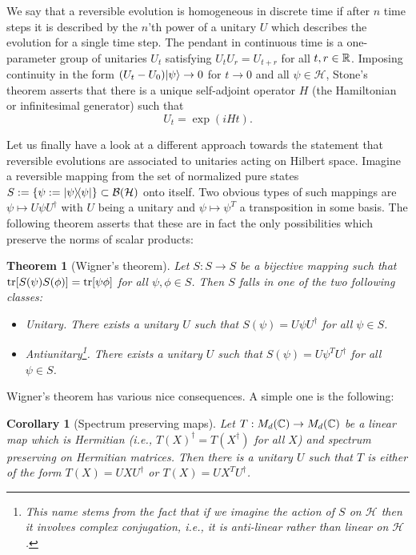 \documentclass[11pt,a4paper]{article}
\theoremstyle{plain}
\newtheorem{theorem}{Theorem}[section]
\newtheorem{corollary}{Corollary}[section]
\theoremstyle{definition}
\theoremstyle{remark}
\numberwithin{equation}{section}
\begin{document}
We say that a reversible evolution is homogeneous in discrete time if after $n$ time steps it is described by the $n$'th power of a unitary $U$ which describes the evolution for a single time step. The pendant in continuous time is a one-parameter group of unitaries $U_t$ satisfying $U_tU_r=U_{t+r}$ for all $t,r\in \mathbb{R}$. Imposing continuity in the form $(U_t-U_0)|\psi\rangle\to 0$ for $t\to 0$ and all $\psi\in \mathcal{H}$, Stone's theorem asserts that there is a unique self-adjoint operator $H$ (the Hamiltonian or infinitesimal generator) such that
\begin{equation}
    U_t = \exp(iHt).
\end{equation}

Let us finally have a look at a different approach towards the statement that reversible evolutions are associated to unitaries acting on Hilbert space. Imagine a reversible mapping from the set of normalized pure states $S:=\{\psi:=|\psi\rangle\!\langle\psi|\}\subset \mathcal{B}(\mathcal{H})$ onto itself. Two obvious types of such mappings are $\psi\mapsto U\psi U^\dagger$ with $U$ being a unitary and $\psi\mapsto \psi^T$ a transposition in some basis. The following theorem asserts that these are in fact the only possibilities which preserve the norms of scalar products:

\begin{theorem}[Wigner's theorem]
    Let $S:S\to S$ be a bijective mapping such that $\operatorname{tr}[S(\psi)S(\phi)]=\operatorname{tr}[\psi\phi]$ for all $\psi,\phi\in S$. Then $S$ falls in one of the two following classes:
    \begin{itemize}
        \item Unitary. There exists a unitary $U$ such that $S(\psi)=U\psi U^\dagger$ for all $\psi\in S$.
        \item Antiunitary\footnote{This name stems from the fact that if we imagine the action of $S$ on $\mathcal{H}$ then it involves complex conjugation, i.e., it is anti-linear rather than linear on $\mathcal{H}$.}. There exists a unitary $U$ such that $S(\psi)=U\psi^T U^\dagger$ for all $\psi\in S$.
    \end{itemize}
\end{theorem}

Wigner's theorem has various nice consequences. A simple one is the following:

\begin{corollary}[Spectrum preserving maps]
    Let $T:M_d(\mathbb{C})\to M_d(\mathbb{C})$ be a linear map which is Hermitian (i.e., $T(X)^\dagger=T(X^\dagger)$ for all $X$) and spectrum preserving on Hermitian matrices. Then there is a unitary $U$ such that $T$ is either of the form $T(X)=UXU^\dagger$ or $T(X)=UX^T U^\dagger$.
\end{corollary}
\end{document}
